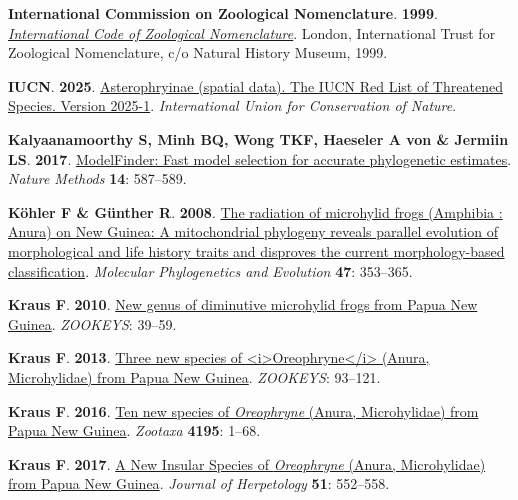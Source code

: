 \documentclass[
  letterpaper,
  DIV=11,
  numbers=noendperiod]{scrartcl}
\newlength{\cslhangindent}
\newenvironment{CSLReferences}[2] %
 {\begin{list}{}{%
  \setlength{\itemindent}{0pt}
  \setlength{\leftmargin}{0pt}
  \setlength{\parsep}{0pt}
  \ifodd #1
   \setlength{\leftmargin}{\cslhangindent}
   \setlength{\itemindent}{-1\cslhangindent}
  \fi
  \setlength{\itemsep}{#2\baselineskip}}}
 {\end{list}}
\begin{document}
\begin{CSLReferences}{0}{1}
\textbf{\textbf{International Commission on Zoological Nomenclature}}.
\textbf{1999}.
\emph{\href{https://www.biodiversitylibrary.org/item/107142}{{International
Code of Zoological Nomenclature}}}. London, International Trust for
Zoological Nomenclature, c/o Natural History Museum, 1999.

\textbf{\textbf{IUCN}}. \textbf{2025}.
\href{https://www.iucnredlist.org/}{{Asterophryinae (spatial data). The
IUCN Red List of Threatened Species. Version 2025-1}}.
\emph{International Union for Conservation of Nature}.

\textbf{\textbf{Kalyaanamoorthy S}, \textbf{Minh BQ}, \textbf{Wong TKF},
\textbf{Haeseler A von} \& \textbf{Jermiin LS}}. \textbf{2017}.
\href{https://doi.org/10.1038/nmeth.4285}{ModelFinder: Fast model
selection for accurate phylogenetic estimates}. \emph{Nature Methods}
\textbf{14}: 587--589.

\textbf{\textbf{Köhler F} \& \textbf{Günther R}}. \textbf{2008}.
\href{https://doi.org/DOI\%2010.1016/j.ympev.2007.11.032}{{The radiation
of microhylid frogs (Amphibia : Anura) on New Guinea: A mitochondrial
phylogeny reveals parallel evolution of morphological and life history
traits and disproves the current morphology-based classification}}.
\emph{Molecular Phylogenetics and Evolution} \textbf{47}: 353--365.

\textbf{\textbf{Kraus F}}. \textbf{2010}.
\href{https://doi.org/10.3897/zookeys.48.446}{{New genus of diminutive
microhylid frogs from Papua New Guinea}}. \emph{ZOOKEYS}: 39--59.

\textbf{\textbf{Kraus F}}. \textbf{2013}.
\href{https://doi.org/10.3897/zookeys.330.5795}{{Three new species of
\textless i\textgreater Oreophryne\textless/i\textgreater{} (Anura,
Microhylidae) from Papua New Guinea}}. \emph{ZOOKEYS}: 93--121.

\textbf{\textbf{Kraus F}}. \textbf{2016}.
\href{https://doi.org/10.11646/zootaxa.4195.1.1}{{Ten new species of
\emph{Oreophryne} (Anura, Microhylidae) from Papua New Guinea}}.
\emph{Zootaxa} \textbf{4195}: 1--68.

\textbf{\textbf{Kraus F}}. \textbf{2017}.
\href{https://doi.org/10.1670/17-002}{{A New Insular Species of
\emph{Oreophryne} (Anura, Microhylidae) from Papua New Guinea}}.
\emph{Journal of Herpetology} \textbf{51}: 552--558.


\end{CSLReferences}
\end{document}
